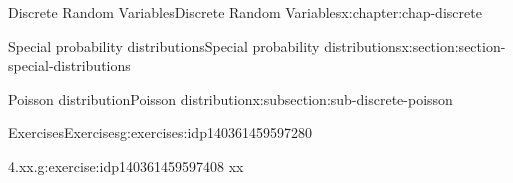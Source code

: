 \documentclass[oneside,10pt,]{book}
\numberwithin{equation}{section}
\begin{document}
\begin{chapterptx}{Discrete Random Variables}{}{Discrete Random Variables}{}{}{x:chapter:chap-discrete}
\begin{sectionptx}{Special probability distributions}{}{Special probability distributions}{}{}{x:section:section-special-distributions}
\begin{subsectionptx}{Poisson distribution}{}{Poisson distribution}{}{}{x:subsection:sub-discrete-poisson}
\end{subsectionptx}
%
%
\typeout{************************************************}
\typeout{************************************************}
%
\begin{exercises-subsection}{Exercises}{}{Exercises}{}{}{g:exercises:idp140361459597280}
\begin{divisionexercise}{1}{4.xx.}{}{g:exercise:idp140361459597408}%
xx%
\end{divisionexercise}%
\end{exercises-subsection}
\end{sectionptx}
\end{chapterptx}
%
%
\typeout{************************************************}
\typeout{************************************************}
%
\end{document}
